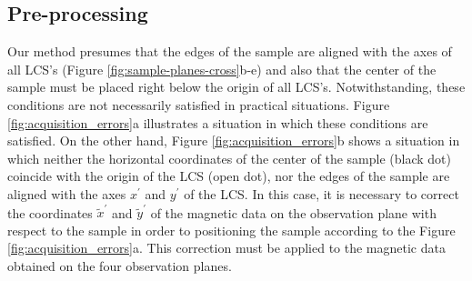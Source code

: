 \documentclass[galley,gc]{agutex}
\begin{document}
\begin{article}
\subsection{Pre-processing}
\label{subsec:Pre-processing}

Our method presumes that the edges of the sample are 
aligned with the axes of all LCS's (Figure 
\ref{fig:sample-planes-cross}b-e) and also that the 
center of the sample must be placed right
below the origin of all LCS's.
Notwithstanding, these conditions are not necessarily satisfied
in practical situations.
Figure \ref{fig:acquisition_errors}a illustrates a situation
in which these conditions are satisfied.
On the other hand, Figure \ref{fig:acquisition_errors}b 
shows a situation in which neither the horizontal coordinates of 
the center of the sample (black dot) coincide with the origin of 
the LCS (open dot), nor the edges of the sample are aligned with
the axes $x^{\prime}$ and $y^{\prime}$ of the LCS.
In this case, it is necessary to correct the coordinates
$\tilde{x}^{\prime}$ and $\tilde{y}^{\prime}$ of the 
magnetic data on the observation plane with respect to the sample 
in order to positioning the sample according to the Figure
\ref{fig:acquisition_errors}a.
This correction must be applied to the
magnetic data obtained on the four observation planes.


\end{article}
\end{document}
